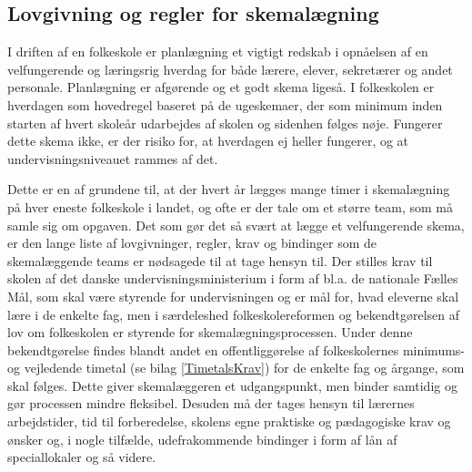 \subsection{Lovgivning og regler for skemalægning}
\label{Lovgivning_og_regler}
I driften af en folkeskole er planlægning et vigtigt redskab i opnåelsen af en velfungerende og læringsrig hverdag for både lærere, elever, sekretærer og andet personale. Planlægning er afgørende og et godt skema ligeså. I folkeskolen er hverdagen som hovedregel baseret på de ugeskemaer, der som minimum inden starten af hvert skoleår udarbejdes af skolen og sidenhen følges nøje\cite{interview_Kaerby}. Fungerer dette skema ikke, er der risiko for, at hverdagen ej heller fungerer, og at undervisningsniveauet rammes af det.

Dette er en af grundene til, at der hvert år lægges mange timer i skemalægning på hver eneste folkeskole i landet, og ofte er der tale om et større team\cite{interview_Kaerby, interview_Tingstrup}, som må samle sig om opgaven. Det som gør det så svært at lægge et velfungerende skema, er den lange liste af lovgivninger, regler, krav og bindinger som de skemalæggende teams er nødsagede til at tage hensyn til. Der stilles krav til skolen af det danske undervisningsministerium i form af bl.a. de nationale Fælles Mål\cite{fmaal}, som skal være styrende for undervisningen og er mål for, hvad eleverne skal lære i de enkelte fag, men i særdeleshed folkeskolereformen og bekendtgørelsen af lov om folkeskolen\cite{Lovgivning} er styrende for skemalægningsprocessen. Under denne bekendtgørelse findes blandt andet en offentliggørelse af folkeskolernes minimums- og vejledende timetal (se bilag \ref{TimetalsKrav}) for de enkelte fag og årgange, som skal følges. Dette giver skemalæggeren et udgangspunkt, men binder samtidig og gør processen mindre fleksibel. Desuden må der tages hensyn til lærernes arbejdstider, tid til forberedelse, skolens egne praktiske og pædagogiske krav og ønsker og, i nogle tilfælde, udefrakommende bindinger i form af lån af speciallokaler og så videre.
